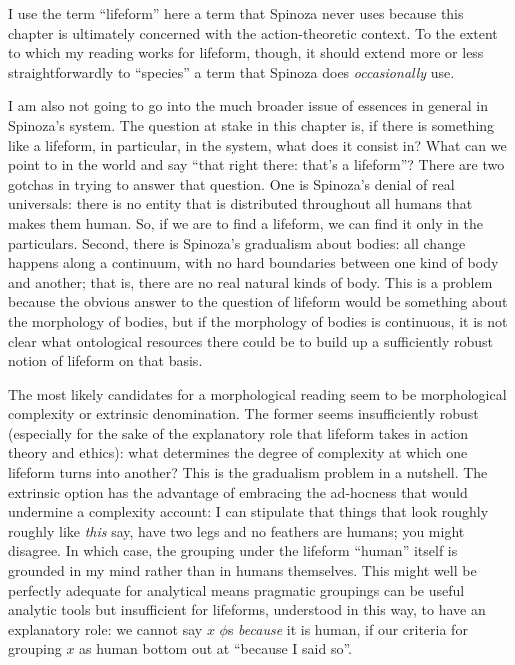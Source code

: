 \documentclass{article}
\newcommand{\dash}{\unskip{—}}
\begin{document}
I use the term \enquote{lifeform} here \dash a term that Spinoza never uses \dash because this chapter is ultimately concerned with the action-theoretic context. To the extent to which my reading works for lifeform, though, it should extend more or less straightforwardly to \enquote{species} \dash a term that Spinoza does \emph{occasionally} use.

I am also not going to go into the much broader issue of essences in general in Spinoza's system. The question at stake in this chapter is, if there is something like a lifeform, in particular, in the system, what does it consist in? What can we point to in the world and say \enquote{that right there: that's a lifeform}? There are two gotchas in trying to answer that question. One is Spinoza's denial of real universals: there is no entity that is distributed throughout all humans that makes them human. So, if we are to find a lifeform, we can find it only in the particulars. Second, there is Spinoza's gradualism about bodies: all change happens along a continuum, with no hard boundaries between one kind of body and another; that is, there are no real natural kinds of body. This is a problem because the obvious answer to the question of lifeform would be something about the morphology of bodies, but if the morphology of bodies is continuous, it is not clear what ontological resources there could be to build up a sufficiently robust notion of lifeform on that basis.

The most likely candidates for a morphological reading seem to be morphological complexity or extrinsic denomination. The former seems insufficiently robust (especially for the sake of the explanatory role that lifeform takes in action theory and ethics): what determines the degree of complexity at which one lifeform turns into another? This is the gradualism problem in a nutshell. The extrinsic option has the advantage of embracing the ad-hocness that would undermine a complexity account: I can stipulate that things that look roughly roughly like \emph{this} \dash say, have two legs and no feathers \dash are humans; you might disagree. In which case, the grouping under the lifeform \enquote{human} itself is grounded in my mind rather than in humans themselves. This might well be perfectly adequate for analytical means \dash pragmatic groupings can be useful analytic tools \dash but insufficient for lifeforms, understood in this way, to have an explanatory role: we cannot say $x$ $\phi$s \emph{because} it is human, if our criteria for grouping $x$ as human bottom out at \enquote{because I said so}.
\end{document}
